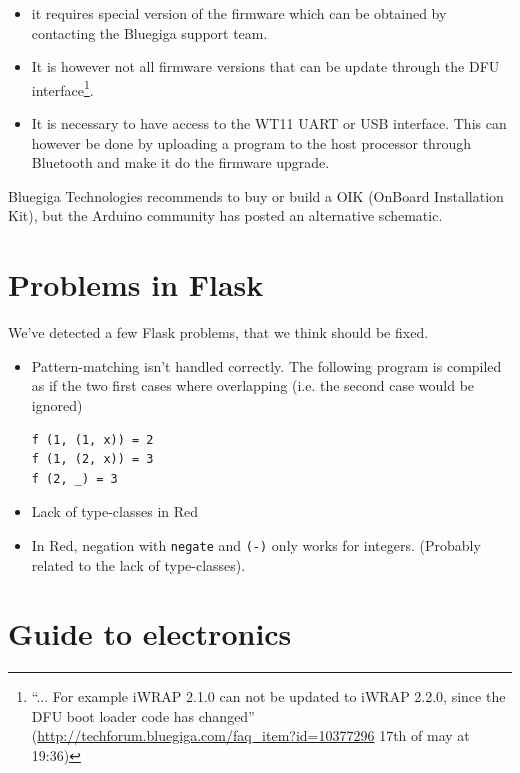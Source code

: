 \documentclass[a4paper, oneside, final]{memoir}
\begin{document}
\begin{itemize}
\item it requires special version of the firmware which can be obtained by
  contacting the Bluegiga support team.

\item It is however not all firmware versions that can be update through the DFU
  interface\footnote{``... For example iWRAP 2.1.0 can not be updated to iWRAP
    2.2.0, since the DFU boot loader code has changed''
    (\url{http://techforum.bluegiga.com/faq_item?id=10377296} 17th of may at
    19:36)}.

\item It is necessary to have access to the WT11 UART or USB
  interface. This can however be done by uploading a program to the host
  processor through Bluetooth and make it do the firmware upgrade.
\end{itemize}

Bluegiga Technologies recommends to buy or build\cite{oik_chematic} a OIK
(OnBoard Installation Kit), but the Arduino community has posted an
alternative schematic\cite{oik_chematic_arduino}.


\chapter{Problems in Flask}
We've detected a few Flask problems, that we think should be fixed.

\begin{itemize}
\item Pattern-matching isn't handled correctly. The following program
  is compiled as if the two first cases where overlapping (i.e. the
  second case would be ignored)
\begin{verbatim}
f (1, (1, x)) = 2
f (1, (2, x)) = 3
f (2, _) = 3
\end{verbatim}

\item Lack of type-classes in Red
\item In Red, negation with \texttt{negate} and \texttt{(-)} only works for
  integers. (Probably related to the lack of type-classes).
\end{itemize}

\chapter{Guide to electronics}
\end{document}
